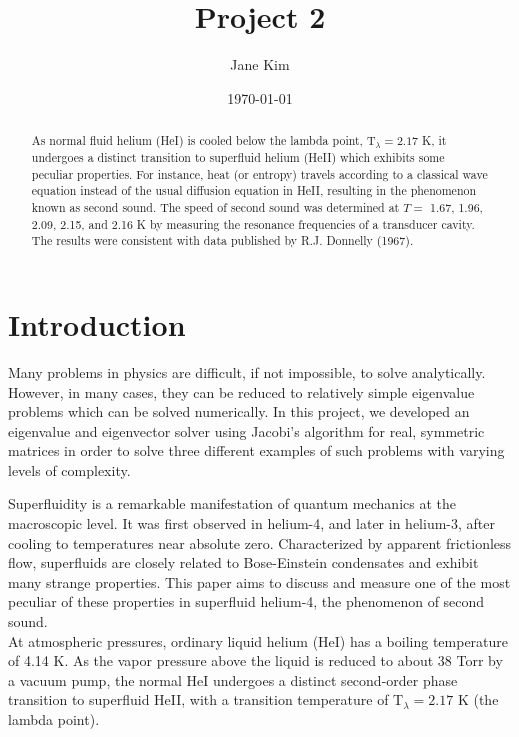 \documentclass[prb,aps,twocolumn,showpacs,10pt]{revtex4-1}
\begin{document}
\title {Project 2}

\author{Jane Kim}
\date{\today}


\begin{abstract}
\noindent As normal fluid helium (HeI) is cooled below the lambda point, T$_\lambda=2.17$ K, it undergoes a distinct transition to superfluid helium (HeII) which exhibits some peculiar properties. For instance, heat (or entropy) travels according to a classical wave equation instead of the usual diffusion equation in HeII, resulting in the phenomenon known as second sound. The speed of second sound was determined at $T =$ 1.67, 1.96, 2.09, 2.15, and 2.16 K by measuring the resonance frequencies of a transducer cavity. The results were consistent with data published by R.J. Donnelly (1967).\\
\end{abstract}



\maketitle

\section{Introduction}

Many problems in physics are difficult, if not impossible, to solve analytically. However, in many cases, they can be reduced to relatively simple eigenvalue problems which can be solved numerically. In this project, we developed an eigenvalue and eigenvector solver using Jacobi's algorithm for real, symmetric matrices in order to solve three different examples of such problems with varying levels of complexity.

Superfluidity is a remarkable manifestation of quantum mechanics at the macroscopic level. It was first observed in helium-4, and later in helium-3, after cooling to temperatures near absolute zero. Characterized by apparent frictionless flow\cite{nwe}, superfluids are closely related to Bose-Einstein condensates\cite{phy} and exhibit many strange properties. This paper aims to discuss and measure one of the most peculiar of these properties in superfluid helium-4, the phenomenon of second sound.\\

At atmospheric pressures, ordinary liquid helium (HeI) has a boiling temperature of 4.14 K. As the vapor pressure above the liquid is reduced to about 38 Torr\cite{phy} by a vacuum pump, the normal HeI undergoes a distinct second-order phase transition to superfluid HeII, with a transition temperature of T$_\lambda=2.17$ K (the lambda point). \\
\end{document}
